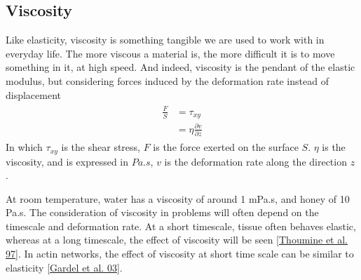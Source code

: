 \documentclass[A4paperpaper,11pt,english]{sphinxmanual}
\begin{document}
\subsection{Viscosity}
\label{index-latex:viscosity}
Like elasticity, viscosity is something tangible we are used to work with in
everyday life. The more viscous a material is, the more difficult it is to move
something in it, at high speed. And indeed, viscosity is the pendant of the elastic
modulus, but considering forces induced by the deformation rate instead of displacement
\label{index-latex:equation-eqa12}\begin{gather}
\begin{split}\frac{F}{S} &= \tau_{xy} \\
            &= \eta \frac{\partial v}{\partial z}\end{split}\label{index-latex-eqa12}
\end{gather}
In which \(\tau_{xy}\) is the shear stress, \(F\) is the force exerted
on the surface \(S\). \(\eta\) is the viscosity, and is expressed in
\(Pa.s\), \(v\) is the deformation rate along the direction \(z\) .

At room temperature, water has a viscosity of around 1 mPa.s, and honey of 10 Pa.s. The consideration of viscosity in problems will
often depend on the timescale and deformation rate. At a short
timescale, tissue often behaves elastic, whereas at a long timescale, the effect
of viscosity will be seen {\hyperref[index-latex:thoumine1997]{{[}Thoumine et al. 97{]}}}. In actin networks, the effect of
viscosity at short time scale can be similar to elasticity {\hyperref[index-latex:gardel2003]{{[}Gardel et al. 03{]}}}.
\end{document}
